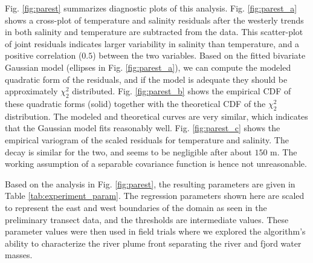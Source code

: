 \documentclass[aoas]{imsart}
\begin{document}
Fig. \ref{fig:parest} summarizes diagnostic plots of this
analysis. Fig. \ref{fig:parest_a} shows a cross-plot of temperature
and salinity residuals after the westerly trends in both salinity and
temperature are subtracted from the data. This scatter-plot of joint
residuals indicates larger variability in salinity than
temperature, and a positive correlation ($0.5$) between the two
variables. Based on the fitted bivariate Gaussian model (ellipses in
Fig. \ref{fig:parest_a}), we can compute the modeled quadratic form of
the residuals, and if the model is adequate they should be
approximately $\chi^2_2$ distributed. Fig. \ref{fig:parest_b} shows
the empirical CDF of these
quadratic forms (solid) together with the theoretical CDF of the
$\chi^2_2$ distribution. The modeled and theoretical curves are very
similar, which indicates that the Gaussian model fits reasonably
well. Fig. \ref{fig:parest_c} shows the empirical variogram of the
scaled residuals for temperature and salinity. The decay is similar
for the two, and seems to be negligible after about $150$ m.
The working assumption of a separable covariance function is hence not unreasonable.

Based on the analysis in Fig. \ref{fig:parest}, the resulting
parameters are given in Table \ref{tab:experiment_param}. The
regression parameters shown here are scaled to represent the east and
west boundaries of the domain as seen in the preliminary transect
data, and the thresholds are intermediate values. These parameter
values were then used in field trials where we explored the
algorithm's ability to characterize the river plume front separating
the river and fjord water masses.

\end{document}
